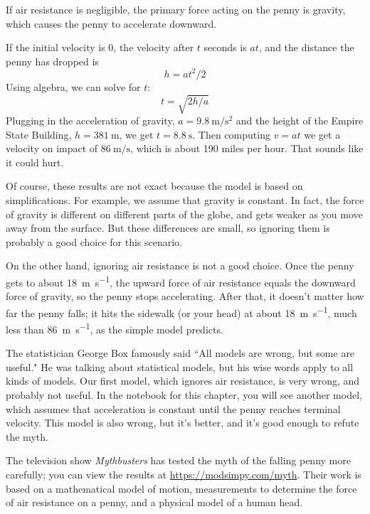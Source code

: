 \documentclass[12pt]{book}
\theoremstyle{exercise}
\begin{document}
If air resistance is negligible, the primary force acting on the penny is gravity, which causes the penny to accelerate downward.

If the initial velocity is 0, the velocity after $t$ seconds is $a t$, and the distance the penny has dropped is
%
\[ h = a t^2 / 2 \]
%
Using algebra, we can solve for $t$:
%
\[ t = \sqrt{ 2 h / a} \]
%
Plugging in the acceleration of gravity, $a = \SI{9.8}{\meter\per\second\squared}$ and the height of the Empire State Building, $h=\SI{381}{\meter}$, we get $t = \SI{8.8}{\second}$.  Then computing $v = a t$ we get a velocity on impact of $\SI{86}{\meter\per\second}$, which is about 190 miles per hour.  That sounds like it could hurt.

Of course, these results are not exact because the model is based on simplifications.  For example, we assume that gravity is constant.  In fact, the force of gravity is different on different parts of the globe, and gets weaker as you move away from the surface.  But these differences are small, so ignoring them is probably a good choice for this scenario.

On the other hand, ignoring air resistance is not a good choice.  Once the penny gets to about \SI{18}{\meter\per\second}, the upward force of air resistance equals the downward force of gravity, so the penny stops accelerating.  After that, it doesn't matter how far the penny falls; it hits the sidewalk (or your head) at about \SI{18}{\meter\per\second}, much less than \SI{86}{\meter\per\second}, as the simple model predicts.

The statistician George Box famously said ``All models are wrong, but some are useful."  He was talking about statistical models, but his wise words apply to all kinds of models.  Our first model, which ignores air resistance, is very wrong, and probably not useful.  In the notebook for this chapter, you will see another model, which assumes that acceleration is constant until the penny reaches terminal velocity.  This model is also wrong, but it's better, and it's good enough to refute the myth.


The television show {\it Mythbusters} has tested the myth of the falling penny more carefully; you can view the results at \url{https://modsimpy.com/myth}.  Their work is based on a mathematical model of motion, measurements to determine the force of air resistance on a penny, and a physical model of a human head.
\end{document}
